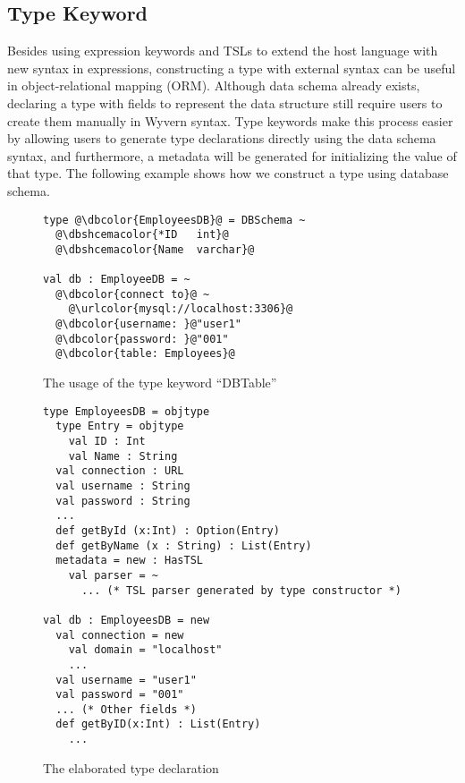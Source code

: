 \documentclass{sig-alternate}
\newcommand{\urlcolor}[1]{\textcolor[HTML]{FFCC33}{#1}}
\newcommand{\dbcolor}[1]{\textcolor[HTML]{FF47FF}{#1}}
\newcommand{\dbshcemacolor}[1]{\textcolor[HTML]{5AC3D1}{#1}}
\newcommand{\mycaption}[1]{\vspace{-4px}\caption{#1}\vspace{-2px}}
\begin{document}
\subsection{Type Keyword}
Besides using expression keywords and TSLs to extend the host language with new syntax in expressions, constructing a type with external syntax can be useful in object-relational mapping (ORM). Although data schema already exists, declaring a type with fields to represent the data structure still require users to create them manually in Wyvern syntax. Type keywords make this process easier by allowing users to generate type declarations directly using the data schema syntax, and furthermore, a metadata will be generated for initializing the value of that type. The following example shows how we construct a type using database schema.

\begin{figure}
\begin{lstlisting}[style=wyvern]
type @\dbcolor{EmployeesDB}@ = DBSchema ~
  @\dbshcemacolor{*ID   int}@
  @\dbshcemacolor{Name  varchar}@

val db : EmployeeDB = ~
  @\dbcolor{connect to}@ ~
    @\urlcolor{mysql://localhost:3306}@
  @\dbcolor{username: }@"user1"
  @\dbcolor{password: }@"001"
  @\dbcolor{table: Employees}@
\end{lstlisting}
\mycaption{The usage of the type keyword ``DBTable''}
\label{f-tykwexample}
\end{figure}

\begin{figure}[ht]
\begin{lstlisting}[style=wyvern]
type EmployeesDB = objtype
  type Entry = objtype
    val ID : Int
    val Name : String 
  val connection : URL
  val username : String
  val password : String
  ...
  def getById (x:Int) : Option(Entry)
  def getByName (x : String) : List(Entry)
  metadata = new : HasTSL
    val parser = ~
      ... (* TSL parser generated by type constructor *)

val db : EmployeesDB = new
  val connection = new
    val domain = "localhost"
    ...
  val username = "user1"
  val password = "001"
  ... (* Other fields *)
  def getByID(x:Int) : List(Entry)
    ...
\end{lstlisting}
\mycaption{The elaborated type declaration}
\label{typekw-example-2}
\end{figure}
\end{document}
